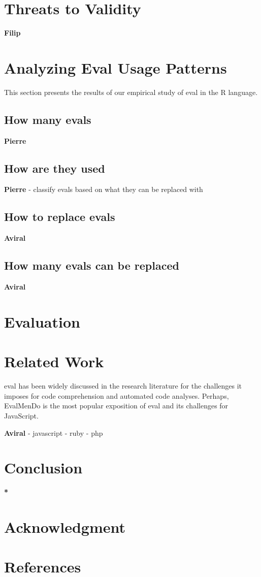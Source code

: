 \documentclass[conference]{IEEEtran}
\begin{document}
\section{Threats to Validity}
\textbf{Filip}

\section{Analyzing Eval Usage Patterns}
This section presents the results of our empirical study of eval in the R language.
\subsection{How many evals}
\textbf{Pierre}

\subsection{How are they used}
\textbf{Pierre}
- classify evals based on what they can be replaced with

\subsection{How to replace evals}
\textbf{Aviral}

\subsection{How many evals can be replaced}
\textbf{Aviral}

\section{Evaluation}

\section{Related Work}
eval has been widely discussed in the research literature for the challenges it
imposes for code comprehension and automated code analyses.
Perhaps, EvalMenDo is the most popular exposition of eval and its
challenges for JavaScript. 

\textbf{Aviral}
- javascript
- ruby
- php

\section{Conclusion}
\textbf{*}


\section*{Acknowledgment}

\section*{References}
\end{document}
